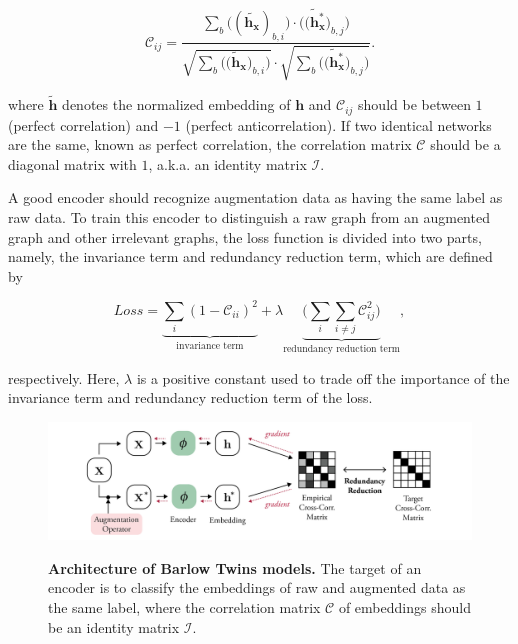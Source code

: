 \begin{equation}
\mathcal{C}_{ij}=\frac{\sum_b\big((\tilde{\textbf{h}_\textbf{x}})_{b,i}\big)\cdot\big(\tilde{(\textbf{h}_\textbf{x}^{*}})_{b,j}\big)}{\sqrt{\sum_b\big(\tilde{(\textbf{h}_\textbf{x}})_{b,i}\big)}\cdot\sqrt{\sum_b\big(\tilde{(\textbf{h}_\textbf{x}^{*}})_{b,j}\big)}}.
\end{equation}

where $\tilde{\textbf{h}}$ denotes the normalized embedding of $\textbf{h}$ and $\mathcal{C}_{ij}$ should be between $1$ (perfect correlation) and $-1$ (perfect anticorrelation). If two identical networks are the same, known as perfect correlation, the correlation matrix $\mathcal{C}$ should be a diagonal matrix with $1$, a.k.a. an identity matrix $\mathcal{I}$. 

A good encoder should recognize augmentation data as having the same label as raw data. To train this encoder to distinguish a raw graph from an augmented graph and other irrelevant graphs, the loss function is divided into two parts, namely, the invariance term and redundancy reduction term, which are defined by

\begin{equation}
\mathit{Loss}=\underbrace{\sum_i(1-\mathcal{C}_{ii})^2}_{\text{invariance term}}+\lambda\underbrace{\Big(\sum_i\sum_{i\neq j}\mathcal{C}_{ij}^2\Big)}_{\text{{redundancy reduction  term}}},
\end{equation}

respectively. Here, $\lambda$ is a positive constant used to trade off the importance of the invariance term and redundancy reduction term of the loss. 

\begin{figure}[!htbp]
{\includegraphics[width=1\textwidth]{./figures/model3_barlowtwins.png}}
\vspace{0.5cm}
\caption[Architecture of Barlow Twins models]{\textbf{Architecture of Barlow Twins models.} The target of an encoder is to classify the embeddings of raw and augmented data as the same label, where the correlation matrix $\mathcal{C}$ of embeddings should be an identity matrix $\mathcal{I}$.}
\label{fig:arch-bt}
\end{figure}






